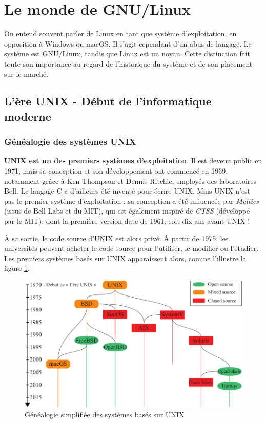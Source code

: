 \section{Le monde de GNU/Linux} \label{sec:GNU}

On entend souvent parler de Linux en tant que système d'exploitation, en opposition à Windows ou macOS. Il s'agit cependant d'un abus de langage. Le système est GNU/Linux, tandis que Linux est un noyau. Cette distinction fait toute son importance au regard de l'historique du système et de son placement sur le marché.

\subsection{L'ère UNIX - Début de l'informatique moderne}

\subsubsection{Généalogie des systèmes UNIX}
\textbf{UNIX est un des premiers systèmes d'exploitation}. Il est devenu public en 1971, mais sa conception et son développement ont commencé en 1969, notamment grâce à Ken Thompson et Dennis Ritchie, employés des laboratoires Bell. Le langage C a d'ailleurs été inventé pour écrire UNIX. Mais UNIX n'est pas le premier système d'exploitation : sa conception a été influencée par \textit{Multics} (issus de Bell Labs et du MIT), qui est également inspiré de \textit{CTSS} (développé par le MIT), dont la première version date de 1961, soit dix ans avant UNIX !

À sa sortie, le code source d'UNIX est alors privé. À partir de 1975, les universités peuvent acheter le code source pour l'utiliser, le modifier ou l'étudier. Les premiers systèmes basés sur UNIX apparaissent alors, comme l'illustre la figure \ref{fig:unix}.

\begin{figure}[hb!]
\includegraphics[width=\textwidth]{res/unix_genealogy.pdf}
\centering
\caption{Généalogie simplifiée des systèmes basés sur UNIX}
\label{fig:unix}
\end{figure}

